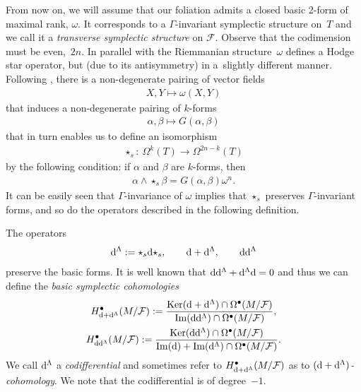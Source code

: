 \documentclass[pdftex]{sigma}
\numberwithin{equation}{section}
\begin{document}
From now on, we will assume that our foliation admits a closed basic 2-form of maximal rank, $\omega$. It corresponds to a $\Gamma$-invariant symplectic structure on~$T$ and we call it a \emph{transverse symplectic structure} on $\mathcal{F}$. Observe that the codimension must be even,~$2n$. In parallel with the Riemmanian structure~$\omega$ defines a Hodge star operator, but (due to its antisymmetry) in a~slightly different manner. Following \cite[Section~2.1]{brylinski}, there is a non-degenerate pairing of vector fields
\begin{gather*}
X, Y \mapsto \omega(X,Y)
\end{gather*}
that induces a non-degenerate pairing of $k$-forms
\begin{gather*}
\alpha, \beta \mapsto G(\alpha,\beta)
\end{gather*}
that in turn enables us to define an isomorphism
\begin{gather*}
\star_{s}\colon \ \Omega^{k}(T)\longrightarrow \Omega^{2n-k}(T)
\end{gather*}
by the following condition: if $\alpha$ and $\beta$ are $k$-forms, then
\begin{gather*}
\alpha\wedge \star_s\beta=G(\alpha,\beta)\omega^n.
\end{gather*}
It can be easily seen that $\Gamma$-invariance of $\omega$ implies that $\star_s$ preserves $\Gamma$-invariant forms, and so do the operators described in the following definition.
\begin{Definition}
The operators
\begin{gather*}
{\rm d}^{\Lambda}:=\star_s {\rm d} \star_s, \qquad {\rm d}+{\rm d}^{\Lambda},\qquad {\rm d}{\rm d}^{\Lambda}
\end{gather*}
preserve the basic forms. It is well known that ${\rm d}{\rm d}^{\Lambda}+{\rm d}^{\Lambda}{\rm d}=0$ and thus we can define the \emph{basic symplectic cohomologies}
\begin{gather*}
H^{\bullet}_{{\rm d}+{\rm d}^{\Lambda}}(M\slash\mathcal{F}):=\frac{\operatorname{Ker}({\rm d}+{\rm d}^{\Lambda})\cap \Omega^{\bullet}(M\slash\mathcal{F})}{\operatorname{Im}({\rm d}{\rm d}^{\Lambda})\cap \Omega^{\bullet}(M\slash\mathcal{F})},\\
H^{\bullet}_{{\rm d}{\rm d}^{\Lambda}}(M\slash\mathcal{F}):=\frac{\operatorname{Ker}({\rm d}{\rm d}^{\Lambda})\cap\Omega^{\bullet}(M\slash\mathcal{F})}{\operatorname{Im}({\rm d})+\operatorname{Im}({\rm d}^{\Lambda})\cap \Omega^{\bullet}(M\slash\mathcal{F})}.
\end{gather*}
We call ${\rm d}^{\Lambda}$ a \emph{codifferential} and sometimes refer to $H^{\bullet}_{{\rm d}+{\rm d}^{\Lambda}}(M\slash\mathcal{F})$ as to \emph{$({\rm d}+{\rm d}^{\Lambda})$-cohomology}. We note that the codifferential is of degree~$-1$.
\end{Definition}
\end{document}
